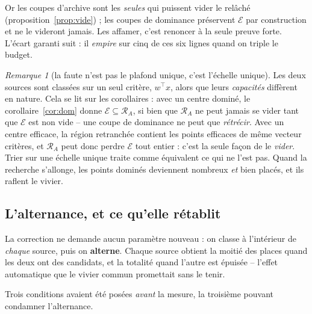 \documentclass[11pt,a4paper]{article}
\theoremstyle{plain}
\theoremstyle{remark}
\newtheorem{remark}{Remarque}
\newcommand{\Ecal}{\mathcal{E}}
\newcommand{\Rcal}{\mathcal{R}}
\begin{document}
Or les coupes d'archive sont les \emph{seules} qui puissent vider le
relâché (proposition~\ref{prop:vide}) ; les coupes de dominance préservent
$\Ecal$ par construction et ne le videront jamais. Les affamer, c'est
renoncer à la seule preuve forte. L'écart garanti suit : il \emph{empire}
sur cinq de ces six lignes quand on triple le budget.

\begin{remark}[la faute n'est pas le plafond unique, c'est l'échelle unique]
Les deux sources sont classées sur un seul critère, $w^{\top}x$, alors que
leurs \emph{capacités} diffèrent en nature. Cela se lit sur les corollaires :
avec un centre dominé, le corollaire~\ref{cor:dom} donne
$\Ecal\subseteq\Rcal_A$, si bien que $\Rcal_A$ ne peut jamais se vider tant
que $\Ecal$ est non vide -- une coupe de dominance ne peut que
\emph{rétrécir}. Avec un centre efficace, la région retranchée contient les
points efficaces de même vecteur critères, et $\Rcal_A$ peut donc perdre
$\Ecal$ tout entier : c'est la seule façon de le \emph{vider}. Trier sur une
échelle unique traite comme équivalent ce qui ne l'est pas. Quand la
recherche s'allonge, les points dominés deviennent nombreux \emph{et} bien
placés, et ils raflent le vivier.
\end{remark}

\subsection{L'alternance, et ce qu'elle rétablit}
\label{sec:alternance}

La correction ne demande aucun paramètre nouveau : on classe à l'intérieur
de \emph{chaque} source, puis on \textbf{alterne}. Chaque source obtient la
moitié des places quand les deux ont des candidats, et la totalité quand
l'autre est épuisée -- l'effet automatique que le vivier commun promettait
sans le tenir.

Trois conditions avaient été posées \emph{avant} la mesure, la troisième
pouvant condamner l'alternance.
\end{document}
